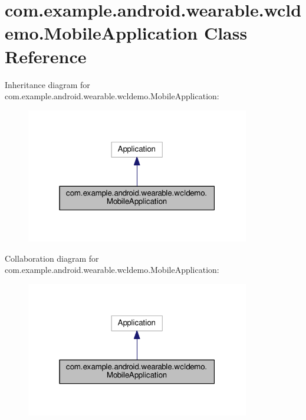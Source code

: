 \hypertarget{classcom_1_1example_1_1android_1_1wearable_1_1wcldemo_1_1MobileApplication}{}\section{com.\+example.\+android.\+wearable.\+wcldemo.\+Mobile\+Application Class Reference}
\label{classcom_1_1example_1_1android_1_1wearable_1_1wcldemo_1_1MobileApplication}


Inheritance diagram for com.\+example.\+android.\+wearable.\+wcldemo.\+Mobile\+Application\+:
\nopagebreak
\begin{figure}[H]
\begin{center}
\leavevmode
\includegraphics[width=277pt]{d3/da9/classcom_1_1example_1_1android_1_1wearable_1_1wcldemo_1_1MobileApplication__inherit__graph}
\end{center}
\end{figure}


Collaboration diagram for com.\+example.\+android.\+wearable.\+wcldemo.\+Mobile\+Application\+:
\nopagebreak
\begin{figure}[H]
\begin{center}
\leavevmode
\includegraphics[width=277pt]{d3/d40/classcom_1_1example_1_1android_1_1wearable_1_1wcldemo_1_1MobileApplication__coll__graph}
\end{center}
\end{figure}
